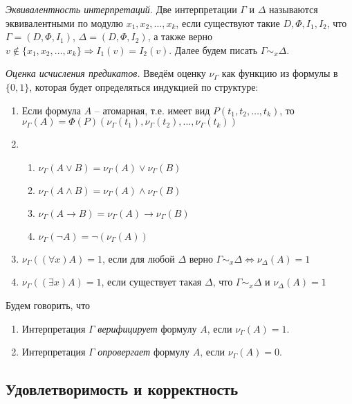 \begin{definition}
  \emph{Эквивалентность интерпретаций.} Две интерпретации $\Gamma$ и $\Delta$ называются эквивалентными по модулю $x_1, x_2, \ldots, x_k$, если существуют такие $D, \Phi, I_1, I_2$, что $\Gamma = {(D, \Phi, I_1)}$, $\Delta = {(D, \Phi, I_2)}$, а также верно $v \notin \{x_1, x_2, \ldots, x_k\} \Rightarrow I_1(v) = I_2(v)$. Далее будем писать $\Gamma \sim_x \Delta$.
\end{definition}

\begin{definition}
  \emph{Оценка исчисления предикатов.} Введём оценку $\nu_{\Gamma}$ как функцию из формулы в $\{0, 1\}$, которая будет определяться индукцией по структуре:
  \begin{enumerate}
  	\item Если формула $A$ -- атомарная, т.е. имеет вид $P(t_1, t_2, \ldots, t_k)$, то $\nu_{\Gamma}(A) = \Phi(P)(\nu_{\Gamma}(t_1), \nu_{\Gamma}(t_2), \ldots, \nu_{\Gamma}(t_k))$
  	\item \begin{enumerate}
    		\item $\nu_\Gamma(A \vee B) = \nu_\Gamma(A) \vee \nu_\Gamma(B)$
    		\item $\nu_\Gamma(A \wedge B) = \nu_\Gamma(A) \wedge \nu_\Gamma(B)$
    		\item $\nu_\Gamma(A \rightarrow B) = \nu_\Gamma(A) \rightarrow \nu_\Gamma(B)$
    		\item $\nu_\Gamma(\neg A) = \neg(\nu_\Gamma(A))$
    	  \end{enumerate}
    \item $\nu_\Gamma((\forall x)A) = 1$, если для любой $\Delta$ верно $\Gamma \sim_x \Delta \iff \nu_\Delta(A) = 1$ 

 \item $\nu_\Gamma((\exists x)A) = 1$, если существует такая $\Delta$, что $\Gamma \sim_x \Delta$ и $\nu_\Delta(A) = 1$
  \end{enumerate}
\end{definition}

Будем говорить, что 
\begin{enumerate}
	\item Интерпретация $\Gamma$ \textit{верифицирует} формулу $A$, если $\nu_{\Gamma}(A) = 1$.
	\item Интерпретация $\Gamma$ \textit{опровергает} формулу $A$, если $\nu_{\Gamma}(A) = 0$.
\end{enumerate}

\subsection{Удовлетворимость и корректность}

